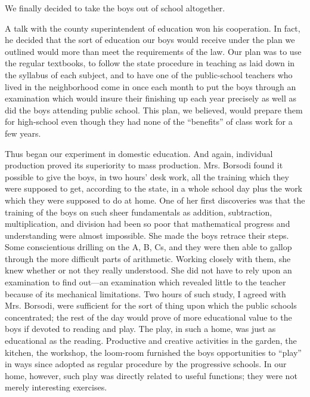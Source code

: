 \documentclass{book}
\begin{document}
We finally decided to take the boys out of school altogether.

A talk with the county superintendent of education won his cooperation. In fact, he decided that the sort of education our boys would receive under the plan we outlined would more than meet the requirements of the law. Our plan was to use the regular textbooks, to follow the state procedure in teaching as laid down in the syllabus of each subject, and to have one of the public-school teachers who lived in the neighborhood come in once each month to put the boys through an examination which would insure their finishing up each year precisely as well as did the boys attending public school. This plan, we believed, would prepare them for high-school even though they had none of the “benefits” of class work for a few years.

Thus began our experiment in domestic education. And again, individual production proved its superiority to mass production. Mrs. Borsodi found it possible to give the boys, in two hours’ desk work, all the training which they were supposed to get, according to the state, in a whole school day plus the work which they were supposed to do at home. One of her first discoveries was that the training of the boys on such sheer fundamentals as addition, subtraction, multiplication, and division had been so poor that mathematical progress and understanding were almost impossible. She made the boys retrace their steps. Some conscientious drilling on the A, B, Cs, and they were then able to gallop through the more difficult parts of arithmetic. Working closely with them, she knew whether or not they really understood. She did not have to rely upon an examination to find out—an examination which revealed little to the teacher because of its mechanical limitations. Two hours of such study, I agreed with Mrs. Borsodi, were sufficient for the sort of thing upon which the public schools concentrated; the rest of the day would prove of more educational value to the boys if devoted to reading and play. The play, in such a home, was just as educational as the reading. Productive and creative activities in the garden, the kitchen, the workshop, the loom-room furnished the boys opportunities to “play” in ways since adopted as regular procedure by the progressive schools. In our home, however, such play was directly related to useful functions; they were not merely interesting exercises.
\end{document}
